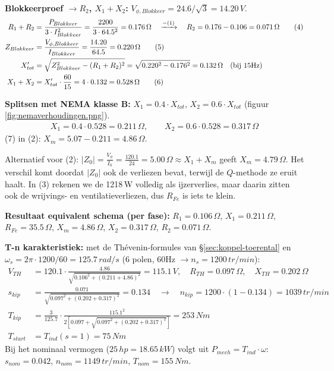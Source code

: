 \begin{oefenblok}
    \textbf{Blokkeerproef $\rightarrow R_2$, $X_1 + X_2$:}
    $V_{\phi,Blokkeer} = 24.6/\sqrt{3} = 14.20\,V$.
    \begin{align}
        R_1 + R_2 &= \frac{P_{Blokkeer}}{3 \cdot I_{Blokkeer}^2} = \frac{2200}{3 \cdot 64.5^2} = 0.176\,\Omega
        \quad \xrightarrow{-(1)} \quad R_2 = 0.176 - 0.106 = 0.071\,\Omega \tag{4} \\
        Z_{Blokkeer} &= \frac{V_{\phi,Blokkeer}}{I_{Blokkeer}} = \frac{14.20}{64.5} = 0.220\,\Omega \tag{5} \\
        X'_{tot} &= \sqrt{Z_{Blokkeer}^2 - (R_1 + R_2)^2} = \sqrt{0.220^2 - 0.176^2} = 0.132\,\Omega
        \quad \text{(bij 15Hz)} \notag \\
        X_1 + X_2 &= X'_{tot} \cdot \frac{60}{15} = 4 \cdot 0.132 = 0.528\,\Omega \tag{6}
    \end{align}

    \textbf{Splitsen met NEMA klasse B:} $X_1 = 0.4 \cdot X_{tot}$, $X_2 = 0.6 \cdot X_{tot}$
    (figuur \ref{fig:nemaverhoudingen.png}).
    \begin{align}
        X_1 = 0.4 \cdot 0.528 = 0.211\,\Omega, \qquad X_2 = 0.6 \cdot 0.528 = 0.317\,\Omega \tag{7}
    \end{align}
    (7) in (2): $X_m = 5.07 - 0.211 = 4.86\,\Omega$.

Alternatief voor (2): $|Z_0| = \frac{V_\phi}{I_0} = \frac{120.1}{24} = 5.00\,\Omega \approx X_1 + X_m$ geeft
$X_m = 4.79\,\Omega$. Het verschil komt doordat $|Z_0|$ ook de verliezen bevat, terwijl de
$Q$-methode ze eruit haalt. In (3) rekenen we de 1218\,W volledig als ijzerverlies, maar daarin
zitten ook de wrijvings- en ventilatieverliezen, dus $R_{Fe}$ is iets te klein.

    \textbf{Resultaat equivalent schema (per fase):}
    $R_1 = 0.106\,\Omega$, $X_1 = 0.211\,\Omega$, $R_{Fe} = 35.5\,\Omega$,
    $X_m = 4.86\,\Omega$, $X_2 = 0.317\,\Omega$, $R_2 = 0.071\,\Omega$.

    \textbf{T-n karakteristiek:} met de Thévenin-formules van §\ref{sec:koppel-toerental}
    en $\omega_s = 2\pi \cdot 1200/60 = 125.7\,rad/s$ (6 polen, 60Hz $\rightarrow n_s = 1200\,tr/min$):
    \begin{align*}
        V_{TH} &= 120.1 \cdot \frac{4.86}{\sqrt{0.106^2 + (0.211 + 4.86)^2}} = 115.1\,V, \quad
        R_{TH} = 0.097\,\Omega, \quad X_{TH} = 0.202\,\Omega \\
        s_{kip} &= \frac{0.071}{\sqrt{0.097^2 + (0.202 + 0.317)^2}} = 0.134
        \quad \rightarrow \quad n_{kip} = 1200 \cdot (1 - 0.134) = 1039\,tr/min \\
        T_{kip} &= \frac{3}{125.7} \cdot \frac{115.1^2}{2[0.097 + \sqrt{0.097^2 + (0.202 + 0.317)^2}]} = 253\,Nm \\
        T_{start} &= T_{ind}(s = 1) = 75\,Nm
    \end{align*}
    Bij het nominaal vermogen ($25\,hp = 18.65\,kW$) volgt uit $P_{mech} = T_{ind} \cdot \omega$:
    $s_{nom} = 0.042$, $n_{nom} = 1149\,tr/min$, $T_{nom} = 155\,Nm$.


\end{oefenblok}
